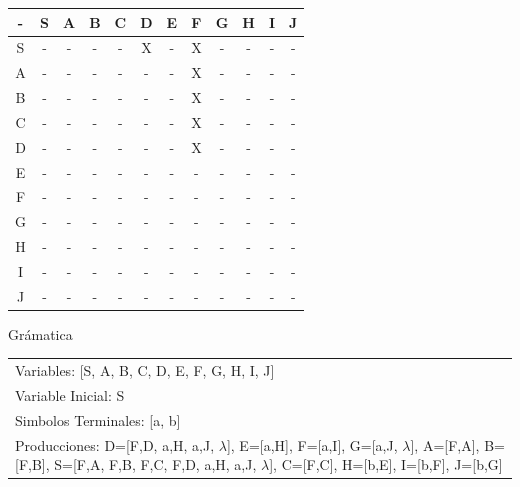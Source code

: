 \documentclass[a4paper,11pt]{article}
\newcommand{\MYp}[1]{ {\color[rgb]{0.392,0.392,0.392}#1} }
\begin{document}
\begin{center}
\begin{tabular}{||c||c||c||c||c||c||c||c||c||c||c||c||}
\hline
\hline
  -  & S & A & B & C & D & E & F & G & H & I & J \\ 
\hline
\hline
 S  &  -  &  -  &  -  &  -  &  X  &  -  &  X  &  -  &  -  &  -  &  -  \\ 
\hline
\hline
 A  &  -  &  -  &  -  &  -  &  -  &  -  &  X  &  -  &  -  &  -  &  -  \\ 
\hline
\hline
 B  &  -  &  -  &  -  &  -  &  -  &  -  &  X  &  -  &  -  &  -  &  -  \\ 
\hline
\hline
 C  &  -  &  -  &  -  &  -  &  -  &  -  &  X  &  -  &  -  &  -  &  -  \\ 
\hline
\hline
 D  &  -  &  -  &  -  &  -  &  -  &  -  &  X  &  -  &  -  &  -  &  -  \\ 
\hline
\hline
 E  &  -  &  -  &  -  &  -  &  -  &  -  &  -  &  -  &  -  &  -  &  -  \\ 
\hline
\hline
 F  &  -  &  -  &  -  &  -  &  -  &  -  &  -  &  -  &  -  &  -  &  -  \\ 
\hline
\hline
 G  &  -  &  -  &  -  &  -  &  -  &  -  &  -  &  -  &  -  &  -  &  -  \\ 
\hline
\hline
 H  &  -  &  -  &  -  &  -  &  -  &  -  &  -  &  -  &  -  &  -  &  -  \\ 
\hline
\hline
 I  &  -  &  -  &  -  &  -  &  -  &  -  &  -  &  -  &  -  &  -  &  -  \\ 
\hline
\hline
 J  &  -  &  -  &  -  &  -  &  -  &  -  &  -  &  -  &  -  &  -  &  -  \\ 
\hline
\hline
\end{tabular}
\end{center}
\MYp{\Huge Gr\'amatica}
\newline
\begin{center}\begin{tabular}{ m{15cm} }


Variables: [S, A, B, C, D, E, F, G, H, I, J] \\
Variable Inicial: S \\
Simbolos Terminales: [a, b] \\
Producciones: {D=[F,D, a,H, a,J, $\lambda$], E=[a,H], F=[a,I], G=[a,J, $\lambda$], A=[F,A], B=[F,B], S=[F,A, F,B, F,C, F,D, a,H, a,J, $\lambda$], C=[F,C], H=[b,E], I=[b,F], J=[b,G]} \\

\end{tabular}
\end{center}
\end{document}
